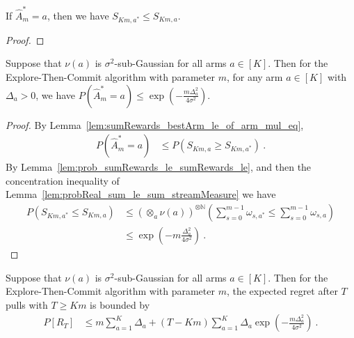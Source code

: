 \begin{lemma}\label{lem:sumRewards_bestArm_le_of_arm_mul_eq}
  \leanok
If $\hat{A}_m^* = a$, then we have $S_{Km, a^*} \le S_{Km, a}$.
\end{lemma}

\begin{proof}\leanok

\end{proof}


\begin{lemma}\label{lem:prob_etc_error_le_exp}
  \leanok
Suppose that $\nu(a)$ is $\sigma^2$-sub-Gaussian for all arms $a \in [K]$.
Then for the Explore-Then-Commit algorithm with parameter $m$, for any arm $a \in [K]$ with $\Delta_a > 0$, we have $P(\hat{A}_m^* = a) \le \exp\left(- \frac{m \Delta_a^2}{4 \sigma^2}\right)$.
\end{lemma}

\begin{proof}\leanok
By Lemma~\ref{lem:sumRewards_bestArm_le_of_arm_mul_eq},
\begin{align*}
  P(\hat{A}_m^* = a)
  &\le P(S_{Km, a} \ge S_{Km, a^*})
  \: .
\end{align*}
By Lemma~\ref{lem:prob_sumRewards_le_sumRewards_le}, and then the concentration inequality of Lemma~\ref{lem:probReal_sum_le_sum_streamMeasure} we have
\begin{align*}
  P\left(S_{Km, a^*} \le S_{Km, a}\right)
  &\le (\otimes_a \nu(a))^{\otimes \mathbb{N}} \left( \sum_{s=0}^{m-1} \omega_{s, a^*} \le \sum_{s=0}^{m-1} \omega_{s, a} \right)
  \\
  &\le \exp\left( -m \frac{\Delta_a^2}{4 \sigma^2} \right)
  \: .
\end{align*}
\end{proof}


\begin{theorem}\label{thm:regret_etc_le}
  \leanok
Suppose that $\nu(a)$ is $\sigma^2$-sub-Gaussian for all arms $a \in [K]$.
Then for the Explore-Then-Commit algorithm with parameter $m$, the expected regret after $T$ pulls with $T \ge Km$ is bounded by
\begin{align*}
  P[R_T]
  &\le m \sum_{a=1}^K \Delta_a + (T - Km) \sum_{a=1}^K \Delta_a \exp\left(- \frac{m \Delta_a^2}{4 \sigma^2}\right)
  \: .
\end{align*}
\end{theorem}

